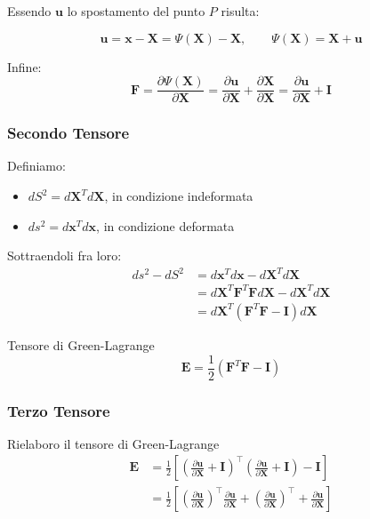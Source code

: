 Essendo $\mathbf{u}$ lo spostamento del punto $P$ risulta:

\begin{equation*}
\mathbf{u} = \mathbf{x} - \mathbf{X} = \Psi(\mathbf{X}) -\mathbf{X}, \quad \quad \Psi(\mathbf{X}) = \mathbf{X}+ \mathbf{u}
\end{equation*}

Infine: 
\begin{equation*}
\boldsymbol{F} = \frac{\partial\Psi(\mathbf{X})}{\partial \mathbf{X} } = \frac{ \partial \mathbf{u} }{\partial \mathbf{X} } + \frac{ \partial\mathbf{X} }{ \partial\mathbf{X} } = \frac{ \partial \mathbf{u} }{\partial \mathbf{X} } + \boldsymbol{I} 
\end{equation*}

\subsubsection*{Secondo Tensore}

Definiamo:
\begin{itemize}
    \item $dS^2 = d\mathbf{X}^T  d\mathbf{X} $, in condizione indeformata
    \item $ds^2 = d\mathbf{x}^T  d\mathbf{x} $, in condizione deformata
\end{itemize}
Sottraendoli fra loro:
\begin{align*}
    ds^2 - dS^2 &= d\mathbf{x}^T  d\mathbf{x}  - d\mathbf{X}^T  d\mathbf{X}\\
    &=  d\mathbf{X}^T \boldsymbol{F}^T \boldsymbol{F} d\mathbf{X} - d\mathbf{X}^T  d\mathbf{X}\\
    &= d\mathbf{X}^T (\boldsymbol{F}^T \boldsymbol{F} - \boldsymbol{I}) d\mathbf{X}
\end{align*}

\begin{definizioneBox}
    Tensore di Green-Lagrange
    \begin{equation*}
\boldsymbol{E} = \frac{1}{2} \left(\boldsymbol{F}^T \boldsymbol{F} - \boldsymbol{I}\right)
\end{equation*}
\end{definizioneBox}

\subsubsection*{Terzo Tensore}

Rielaboro il tensore di Green-Lagrange
\begin{align*}
\boldsymbol{E} &= \frac{1}{2} \left[ \left( \frac{\partial \mathbf{u}}{\partial \mathbf{X}} + \boldsymbol{I} \right)^{\!\top} \left( \frac{\partial \mathbf{u}}{\partial \mathbf{X}} + \boldsymbol{I} \right) - \boldsymbol{I} \right] \\
&= \frac{1}{2} \left[ \left( \frac{\partial \mathbf{u}}{\partial \mathbf{X}} \right)^{\!\top} \frac{\partial \mathbf{u}}{\partial \mathbf{X}} + \left( \frac{\partial \mathbf{u}}{\partial \mathbf{X}} \right)^{\!\top} + \frac{\partial \mathbf{u}}{\partial \mathbf{X}} \right]
\end{align*}

